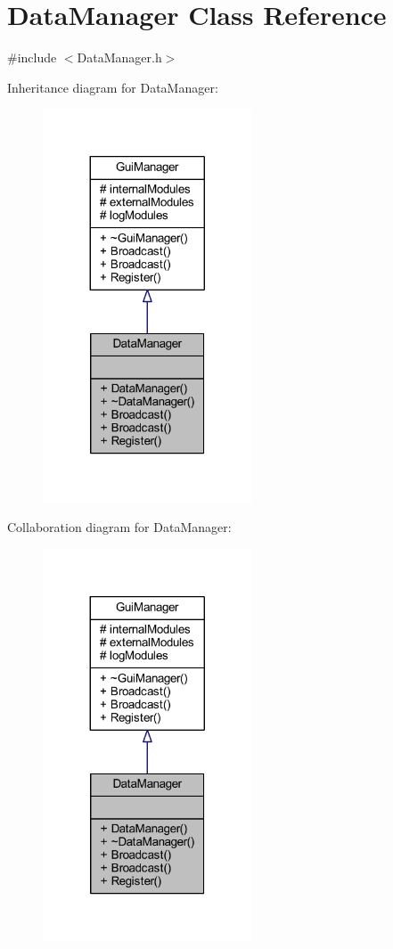 \hypertarget{class_data_manager}{}\section{Data\+Manager Class Reference}
\label{class_data_manager}


{\ttfamily \#include $<$Data\+Manager.\+h$>$}



Inheritance diagram for Data\+Manager\+:\nopagebreak
\begin{figure}[H]
\begin{center}
\leavevmode
\includegraphics[width=176pt]{class_data_manager__inherit__graph}
\end{center}
\end{figure}


Collaboration diagram for Data\+Manager\+:\nopagebreak
\begin{figure}[H]
\begin{center}
\leavevmode
\includegraphics[width=176pt]{class_data_manager__coll__graph}
\end{center}
\end{figure}
